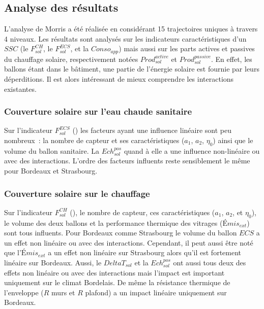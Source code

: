 \subsection{Analyse des résultats} %
\label{sub:analyse_des_resultats_morris}
L’analyse de Morris a été réalisée en considérant \num{15} trajectoires uniques à travers
\num{4} niveaux. Les résultats sont analysés sur les indicateurs caractéristiques d’un $SSC$
(le $F_{sol}^{CH}$, le $F_{sol}^{ECS}$, et la $Conso_{app}$) mais aussi sur les parts
actives et passives du chauffage solaire, respectivement notées $Prod_{sol}^{active}$ et
$Prod_{sol}^{passive}$. En effet, les ballons étant dans le bâtiment, une partie de
l’énergie solaire est fournie par leurs déperditions. Il est alors intéressant de
mieux comprendre les interactions existantes.


\subsubsection{Couverture solaire sur l’eau chaude sanitaire} %
\label{ssub:couverture_solaire_sur_l_ECS}
Sur l’indicateur $F_{sol}^{ECS}$ () les facteurs ayant une influence linéaire sont
peu nombreux~: la nombre de capteur et ses caractéristiques ($a_{1}$, $a_{2}$, $\eta_{0}$)
ainsi que le volume du ballon sanitaire. La $Ech_{sol}^{pos}$ quand à elle a une influence
non-linéaire ou avec des interactions. L’ordre des facteurs influents reste sensiblement le
même pour Bordeaux et Strasbourg.


\subsubsection{Couverture solaire sur le chauffage} %
\label{ssub:couverture_solaire_sur_le_chauffage}
Sur l’indicateur $F_{sol}^{CH}$ (), le nombre de capteur, ces caractéristiques ($a_{1}$,
$a_{2}$, et $\eta_{0}$), le volume des deux ballons et la performance thermique des
vitrages ($Émis_{ext}$) sont tous influents. Pour Bordeaux comme Strasbourg le volume du
ballon $ECS$ a un effet non linéaire ou avec des interactions. Cependant, il peut aussi
être noté que l’$Émis_{ext}$ a un effet non linéaire sur Strasbourg alors qu’il est
fortement linéaire sur Bordeaux. Aussi, le $DeltaT_{sol}$ et la $Ech_{sol}^{pos}$ ont
aussi tous deux des effets non linéaire ou avec des interactions mais l’impact est
important uniquement sur le climat Bordelais. De même la résistance thermique de
l’enveloppe ($R$ murs et $R$ plafond) a un impact linéaire uniquement sur Bordeaux.

